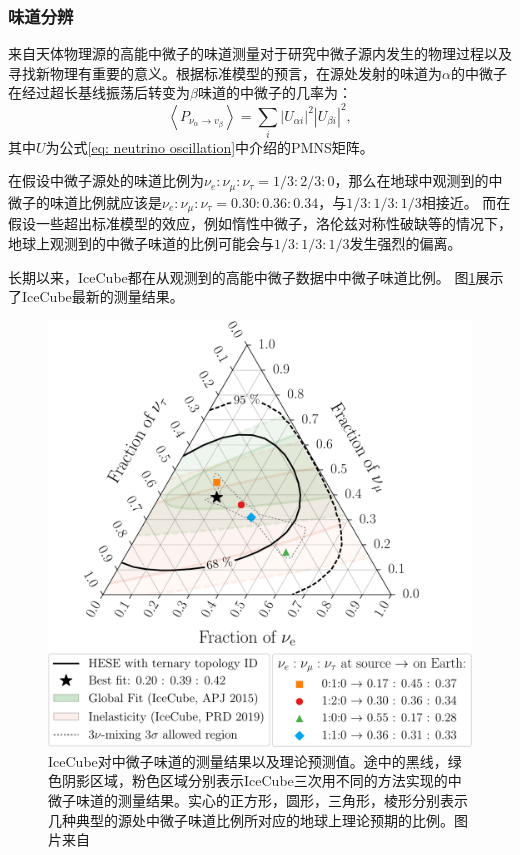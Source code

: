 \subsubsection{味道分辨}

来自天体物理源的高能中微子的味道测量对于研究中微子源内发生的物理过程以及寻找新物理有重要的意义\cite{Arguelles_flavor:2015, snowmass_flavor:2022}。根据标准模型的预言，在源处发射的味道为$\alpha$的中微子在经过超长基线振荡后转变为$\beta$味道的中微子的几率为\cite{Farzan_coherence_oscillation:2008}：
\begin{equation}
    \left\langle P_{\nu_\alpha \rightarrow v_\beta}\right\rangle=\sum_i\left|U_{\alpha i}\right|^2\left|U_{\beta i}\right|^2, 
    \label{eq:flavor_transform}
\end{equation}
其中$U$为公式\ref{eq: neutrino oscillation}中介绍的PMNS矩阵。

在假设中微子源处的味道比例为$\nu_e: \nu_\mu: \nu_\tau=1 / 3: 2 / 3: 0$，那么在地球中观测到的中微子的味道比例就应该是$\nu_e: \nu_\mu: \nu_\tau = 0.30 : 0.36 : 0.34$，与$1/3 : 1/3 : 1/3$相接近。
而在假设一些超出标准模型的效应，例如惰性中微子\cite{IceCube_sterile:2016, Arguelles_flavor_sterile:2019}，洛伦兹对称性破缺\cite{IceCube_flavor_Lorentz:2017}等的情况下，地球上观测到的中微子味道的比例可能会与$1/3 : 1/3 : 1/3$发生强烈的偏离。

长期以来，IceCube都在从观测到的高能中微子数据中中微子味道比例\cite{IceCube_flux_flavor:2015, IceCube_inelestic_flavor:2018, IceCube_tau:2020}。
图\ref{fig:IceCube_flavor_ratio_measurement}展示了IceCube最新的测量结果。

\begin{figure}[htbp]
    \centering
    \includegraphics[width=0.9\linewidth]{img/IceCube_flavor_ratio_measurement.pdf}
    \caption{IceCube对中微子味道的测量结果以及理论预测值。途中的黑线\cite{IceCube_tau:2020}，绿色阴影区域\cite{IceCube_flux_flavor:2015}，粉色区域\cite{IceCube_inelestic_flavor:2018}分别表示IceCube三次用不同的方法实现的中微子味道的测量结果。实心的正方形，圆形，三角形，棱形分别表示几种典型的源处中微子味道比例所对应的地球上理论预期的比例。图片来自\cite{IceCube_tau:2020}}
    \label{fig:IceCube_flavor_ratio_measurement}
\end{figure}

